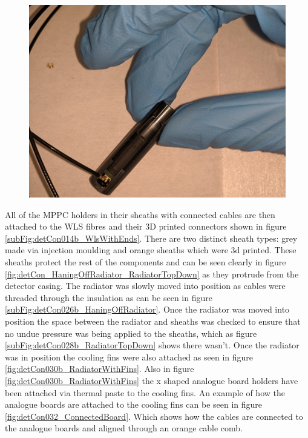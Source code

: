 \begin{figure}[!h]
\centering
\includegraphics[width=0.7\linewidth]{Chapter3/Figs/Raster/detCon023b_HoldersConnectedZoom.png}
\label{fig:detCon023b_HoldersConnectedZoom}
\end{figure}

All of the MPPC holders in their sheaths with connected cables are then attached to the WLS fibres and their 3D printed connectors shown in figure \ref{subFig:detCon014b_WlsWithEnds}. There are two distinct sheath types: grey made via injection moulding and orange sheaths which were 3d printed. These sheaths protect the rest of the components and can be seen clearly in figure \ref{fig:detCon_HaningOffRadiator_RadiatorTopDown} as they protrude from the detector casing. The radiator was slowly moved into position as cables were threaded through the insulation as can be seen in figure \ref{subFig:detCon026b_HaningOffRadiator}. Once the radiator was moved into position the space between the radiator and sheaths was checked to ensure that no undue pressure was being applied to the sheaths, which as figure \ref{subFig:detCon028b_RadiatorTopDown} shows there wasn't. Once the radiator was in position the cooling fins were also attached as seen in figure \ref{fig:detCon030b_RadiatorWithFins}. Also in figure \ref{fig:detCon030b_RadiatorWithFins} the x shaped analogue board holders have been attached via thermal paste to the cooling fins. An example of how the analogue boards are attached to the cooling fins can be seen in figure \ref{fig:detCon032_ConnectedBoard}. Which shows how the cables are connected to the analogue boards and aligned through an orange cable comb. 

